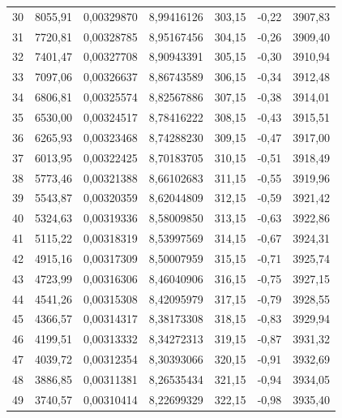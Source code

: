 \documentclass[12pt,a4paper,final,twoside,fleqn]{article}
\begin{document}
\begin{ThreePartTable}
\begin{longtable}{rrrrrrr}
30           & 8055,91   & 0,00329870    & 8,99416126  & 303,15     & -0,22      & 3907,83 \\
31           & 7720,81   & 0,00328785    & 8,95167456  & 304,15     & -0,26      & 3909,40 \\
32           & 7401,47   & 0,00327708    & 8,90943391  & 305,15     & -0,30      & 3910,94 \\
33           & 7097,06   & 0,00326637    & 8,86743589  & 306,15     & -0,34      & 3912,48 \\
34           & 6806,81   & 0,00325574    & 8,82567886  & 307,15     & -0,38      & 3914,01 \\
35           & 6530,00   & 0,00324517    & 8,78416222  & 308,15     & -0,43      & 3915,51 \\
36           & 6265,93   & 0,00323468    & 8,74288230  & 309,15     & -0,47      & 3917,00 \\
37           & 6013,95   & 0,00322425    & 8,70183705  & 310,15     & -0,51      & 3918,49 \\
38           & 5773,46   & 0,00321388    & 8,66102683  & 311,15     & -0,55      & 3919,96 \\
39           & 5543,87   & 0,00320359    & 8,62044809  & 312,15     & -0,59      & 3921,42 \\
40           & 5324,63   & 0,00319336    & 8,58009850  & 313,15     & -0,63      & 3922,86 \\
41           & 5115,22   & 0,00318319    & 8,53997569  & 314,15     & -0,67      & 3924,31 \\
42           & 4915,16   & 0,00317309    & 8,50007959  & 315,15     & -0,71      & 3925,74 \\
43           & 4723,99   & 0,00316306    & 8,46040906  & 316,15     & -0,75      & 3927,15 \\
44           & 4541,26   & 0,00315308    & 8,42095979  & 317,15     & -0,79      & 3928,55 \\
45           & 4366,57   & 0,00314317    & 8,38173308  & 318,15     & -0,83      & 3929,94 \\
46           & 4199,51   & 0,00313332    & 8,34272313  & 319,15     & -0,87      & 3931,32 \\
47           & 4039,72   & 0,00312354    & 8,30393066  & 320,15     & -0,91      & 3932,69 \\
48           & 3886,85   & 0,00311381    & 8,26535434  & 321,15     & -0,94      & 3934,05 \\
49           & 3740,57   & 0,00310414    & 8,22699329  & 322,15     & -0,98      & 3935,40 \\

\end{longtable}
\end{ThreePartTable}
\end{document}
